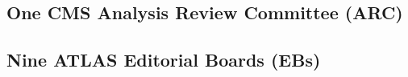 \documentclass[11pt,letterpaper]{article}
\begin{document}
  \begin{itemizetight}

  

  \subsection*{One CMS Analysis Review Committee (ARC)}

  \subsection*{Nine ATLAS Editorial Boards (EBs)}










\end{itemizetight}
\end{document}
